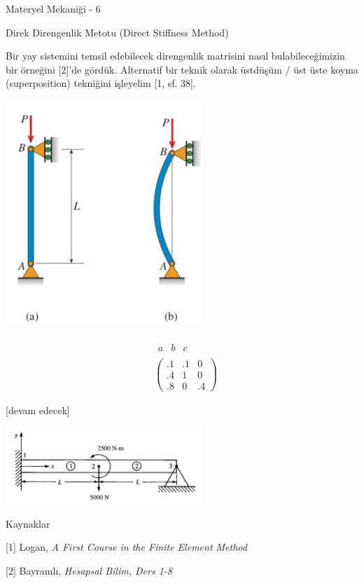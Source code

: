 \documentclass[12pt,fleqn]{article}\usepackage{../../common}
\begin{document}
Materyel Mekaniği - 6

Direk Direngenlik Metotu (Direct Stiffness Method)

Bir yay sistemini temsil edebilecek direngenlik matrisini nasıl
bulabileceğimizin bir örneğini [2]'de gördük. Alternatif bir
teknik olarak üstdüşüm / üst üste koyma (superposition) tekniğini
işleyelim [1, sf. 38]. 

\includegraphics[width=20em]{phy_020_strs_06_02.jpg}


$$
\begin{array}{cc} & \begin{array}{ccc} a & b & c \end{array} \\ &
\left(
\begin{array}{ccc}
.1 & .1 & 0 \\
.4 & 1 & 0 \\
.8 & 0 & .4
\end{array}
\right)
\end{array}
$$





[devam edecek]


\includegraphics[width=20em]{phy_020_strs_06_01.jpg}


Kaynaklar

[1] Logan, {\em A First Course in the Finite Element Method}

[2] Bayramlı, {\em Hesapsal Bilim, Ders 1-8}
\end{document}
